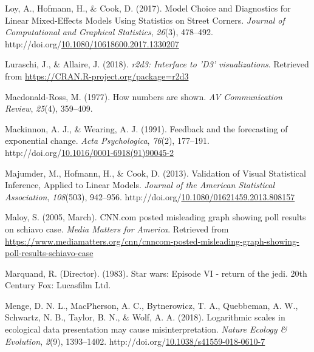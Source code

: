 \documentclass[print]{nuthesis}
\newlength{\cslhangindent}
\newenvironment{CSLReferences}%
{\setlength{\parindent}{0pt}%
\everypar{\setlength{\hangindent}{\cslhangindent}}\ignorespaces}%
{\par}
\begin{document}
\begin{CSLReferences}{1}{0}
\leavevmode{}%
Loy, A., Hofmann, H., \& Cook, D. (2017). Model {Choice} and {Diagnostics} for {Linear} {Mixed}-{Effects} {Models} {Using} {Statistics} on {Street} {Corners}. \emph{Journal of Computational and Graphical Statistics}, \emph{26}(3), 478--492. http://doi.org/\href{https://doi.org/10.1080/10618600.2017.1330207}{10.1080/10618600.2017.1330207}

\leavevmode{}%
Luraschi, J., \& Allaire, J. (2018). \emph{r2d3: Interface to 'D3' visualizations}. Retrieved from \url{https://CRAN.R-project.org/package=r2d3}

\leavevmode{}%
Macdonald-Ross, M. (1977). How numbers are shown. \emph{AV Communication Review}, \emph{25}(4), 359--409.

\leavevmode{}%
Mackinnon, A. J., \& Wearing, A. J. (1991). Feedback and the forecasting of exponential change. \emph{Acta Psychologica}, \emph{76}(2), 177--191. http://doi.org/\href{https://doi.org/10.1016/0001-6918(91)90045-2}{10.1016/0001-6918(91)90045-2}

\leavevmode{}%
Majumder, M., Hofmann, H., \& Cook, D. (2013). Validation of {Visual} {Statistical} {Inference}, {Applied} to {Linear} {Models}. \emph{Journal of the American Statistical Association}, \emph{108}(503), 942--956. http://doi.org/\href{https://doi.org/10.1080/01621459.2013.808157}{10.1080/01621459.2013.808157}

\leavevmode{}%
Maloy, S. (2005, March). CNN.com posted misleading graph showing poll results on schiavo case. \emph{Media Matters for America}. Retrieved from \url{https://www.mediamatters.org/cnn/cnncom-posted-misleading-graph-showing-poll-results-schiavo-case}

\leavevmode{}%
Marquand, R. (Director). (1983). Star wars: Episode VI - return of the jedi. 20th Century Fox: Lucasfilm Ltd.

\leavevmode{}%
Menge, D. N. L., MacPherson, A. C., Bytnerowicz, T. A., Quebbeman, A. W., Schwartz, N. B., Taylor, B. N., \& Wolf, A. A. (2018). Logarithmic scales in ecological data presentation may cause misinterpretation. \emph{Nature Ecology \& Evolution}, \emph{2}(9), 1393--1402. http://doi.org/\href{https://doi.org/10.1038/s41559-018-0610-7}{10.1038/s41559-018-0610-7}


\end{CSLReferences}
\end{document}
